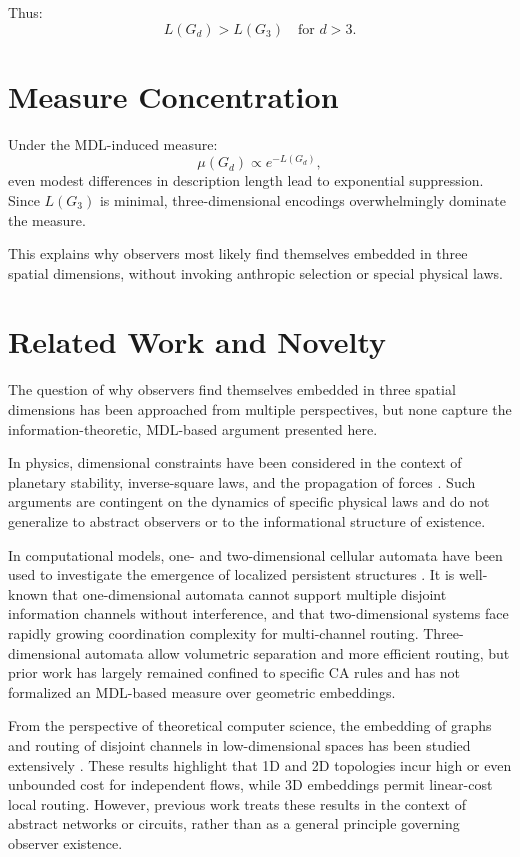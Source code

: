 \documentclass[11pt]{article}
\begin{document}
Thus:
\[
L(G_d) > L(G_3) \quad \text{for } d > 3.
\]

\section{Measure Concentration}

Under the MDL-induced measure:
\[
\mu(G_d) \propto e^{-L(G_d)},
\]
even modest differences in description length lead to exponential suppression. Since $L(G_3)$ is minimal, three-dimensional encodings overwhelmingly dominate the measure.

This explains why observers most likely find themselves embedded in three spatial dimensions, without invoking anthropic selection or special physical laws.


\section{Related Work and Novelty}

The question of why observers find themselves embedded in three spatial dimensions has been approached from multiple perspectives, but none capture the information-theoretic, MDL-based argument presented here.

In physics, dimensional constraints have been considered in the context of planetary stability, inverse-square laws, and the propagation of forces \cite{penrose2010, hawking1996nature, hawking1988}. Such arguments are contingent on the dynamics of specific physical laws and do not generalize to abstract observers or to the informational structure of existence.

In computational models, one- and two-dimensional cellular automata have been used to investigate the emergence of localized persistent structures \cite{zuse1970calculating, Lloyd2006, deutsch1997}. It is well-known that one-dimensional automata cannot support multiple disjoint information channels without interference, and that two-dimensional systems face rapidly growing coordination complexity for multi-channel routing. Three-dimensional automata allow volumetric separation and more efficient routing, but prior work has largely remained confined to specific CA rules and has not formalized an MDL-based measure over geometric embeddings.

From the perspective of theoretical computer science, the embedding of graphs and routing of disjoint channels in low-dimensional spaces has been studied extensively \cite{LiVitanyi, Solomonoff1964, Chaitin1975}. These results highlight that 1D and 2D topologies incur high or even unbounded cost for independent flows, while 3D embeddings permit linear-cost local routing. However, previous work treats these results in the context of abstract networks or circuits, rather than as a general principle governing observer existence.
\end{document}
